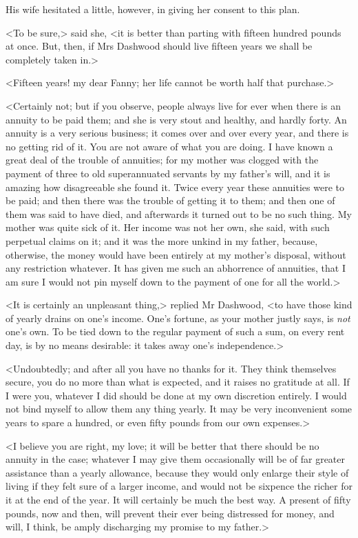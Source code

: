 His wife hesitated a little, however, in giving her consent to this plan.

<To be sure,> said she, <it is better than parting with fifteen hundred pounds at once. But, then, if Mrs Dashwood should live fifteen years we shall be completely taken in.>

<Fifteen years! my dear Fanny; her life cannot be worth half that purchase.>

<Certainly not; but if you observe, people always live for ever when there is an annuity to be paid them; and she is very stout and healthy, and hardly forty. An annuity is a very serious business; it comes over and over every year, and there is no getting rid of it. You are not aware of what you are doing. I have known a great deal of the trouble of annuities; for my mother was clogged with the payment of three to old superannuated servants by my father's will, and it is amazing how disagreeable she found it. Twice every year these annuities were to be paid; and then there was the trouble of getting it to them; and then one of them was said to have died, and afterwards it turned out to be no such thing. My mother was quite sick of it. Her income was not her own, she said, with such perpetual claims on it; and it was the more unkind in my father, because, otherwise, the money would have been entirely at my mother's disposal, without any restriction whatever. It has given me such an abhorrence of annuities, that I am sure I would not pin myself down to the payment of one for all the world.>

<It is certainly an unpleasant thing,> replied Mr Dashwood, <to have those kind of yearly drains on one's income. One's fortune, as your mother justly says, is \textit{not} one's own. To be tied down to the regular payment of such a sum, on every rent day, is by no means desirable: it takes away one's independence.>

<Undoubtedly; and after all you have no thanks for it. They think themselves secure, you do no more than what is expected, and it raises no gratitude at all. If I were you, whatever I did should be done at my own discretion entirely. I would not bind myself to allow them any thing yearly. It may be very inconvenient some years to spare a hundred, or even fifty pounds from our own expenses.>

<I believe you are right, my love; it will be better that there should be no annuity in the case; whatever I may give them occasionally will be of far greater assistance than a yearly allowance, because they would only enlarge their style of living if they felt sure of a larger income, and would not be sixpence the richer for it at the end of the year. It will certainly be much the best way. A present of fifty pounds, now and then, will prevent their ever being distressed for money, and will, I think, be amply discharging my promise to my father.>

